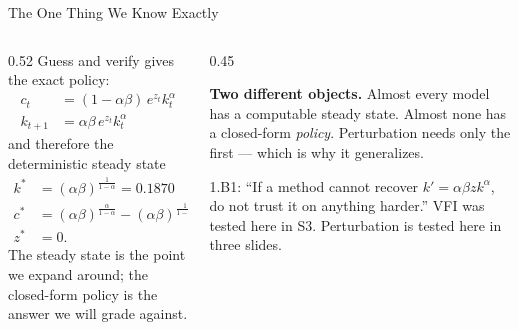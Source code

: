 \begin{frame}{The One Thing We Know Exactly}
\begin{columns}[T]
\begin{column}{0.52\textwidth}
\small
Guess and verify gives the exact policy:
\begin{align*}
c_{t} &= (1-\alpha\beta)\,e^{z_{t}}k_{t}^{\alpha}\\
k_{t+1} &= \alpha\beta\,e^{z_{t}}k_{t}^{\alpha}
\end{align*}
and therefore the deterministic steady state
\begin{align*}
k^{*} &= (\alpha\beta)^{\frac{1}{1-\alpha}} = 0.1870\\
c^{*} &= (\alpha\beta)^{\frac{\alpha}{1-\alpha}}-(\alpha\beta)^{\frac{1}{1-\alpha}}\\
z^{*} &= 0 .
\end{align*}
The steady state is the point we expand around; the closed-form policy is the answer we will grade against.
\end{column}
\begin{column}{0.45\textwidth}
\begin{takeawaybox}\footnotesize
\textbf{Two different objects.} Almost every model has a computable steady state. Almost none has a closed-form \emph{policy}. Perturbation needs only the first --- which is why it generalizes.
\end{takeawaybox}
\medskip
\begin{examplebox}\footnotesize
1.B1: ``If a method cannot recover $k'=\alpha\beta z k^{\alpha}$, do not trust it on anything harder.'' VFI was tested here in S3. Perturbation is tested here in three slides.
\end{examplebox}
\end{column}
\end{columns}
\vspace{1mm}
\end{frame}

